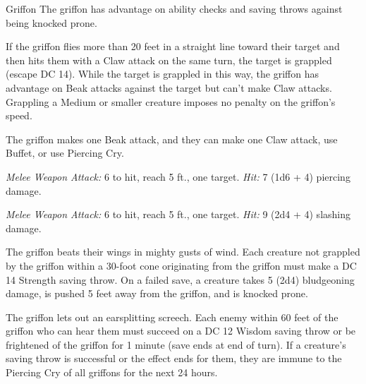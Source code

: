 \documentclass[10pt,a4paper,twoside,bg=print,twocolumn,openany,nodeprecatedcode]{dndbook}
\begin{document}
\begin{DndMonster}[float=t]{Griffon}
\DndMonsterBasics[
armor-class = {12},
hit-points = {\DndDice{6d10 + 24}},
speed = {30 ft., fly 60 ft.}
]
\DndMonsterAbilityScores[
 str = 18,
 dex = 14,
 con = 18,
 int = 6,
 wis = 14,
 cha = 8
]
\DndMonsterDetails[
saving-throws = {Con +6},
skills = {Perception +4},
challenge = 2,
]
The griffon has advantage on ability checks and saving throws against being knocked prone.

If the griffon flies more than 20 feet in a straight line toward their target and then hits them with a Claw attack on the same turn, the target is grappled (escape DC 14). While the target is grappled in this way, the griffon has advantage on Beak attacks against the target but can't make Claw attacks. Grappling a Medium or smaller creature imposes no penalty on the griffon's speed.

The griffon makes one Beak attack, and they can make one Claw attack, use Buffet, or use Piercing Cry.

\textsl{Melee Weapon Attack:} 6 to hit, reach 5 ft., one target. \textsl{Hit:} 7 (1d6 + 4) piercing damage.

\textsl{Melee Weapon Attack:} 6 to hit, reach 5 ft., one target. \textsl{Hit:} 9 (2d4 + 4) slashing damage.

The griffon beats their wings in mighty gusts of wind. Each creature not grappled by the griffon within a 30-foot cone originating from the griffon must make a DC 14 Strength saving throw. On a failed save, a creature takes 5 (2d4) bludgeoning damage, is pushed 5 feet away from the griffon, and is knocked prone.

The griffon lets out an earsplitting screech. Each enemy within 60 feet of the griffon who can hear them must succeed on a DC 12 Wisdom saving throw or be frightened of the griffon for 1 minute (save ends at end of turn). If a creature's saving throw is successful or the effect ends for them, they are immune to the Piercing Cry of all griffons for the next 24 hours.

\end{DndMonster}
\end{document}
